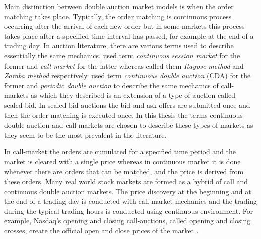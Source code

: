 
Main distinction between double auction market models is when
the order matching takes place. Typically, the order matching 
is continuous process occurring after the arrival of each new order but
in some markets this process takes place after a specified time interval
has passed, for example at the end of a trading day. \citep{boer05}
In auction literature, there are various terms used to describe essentially 
the same mechanics. \citet{boer05} used term 
\textit{continuous session market} for the former and \textit{call-market}
for the latter whereas \citet{ASt05} called them \textit{Itayose method}
and \textit{Zaraba method} respectively. \citet{Moc15} used term \textit{continuous 
double auction} (CDA) for the former and \textit{periodic double auction} to describe 
the same mechanics of call-markets as which they described is an extension of 
a type of auction called sealed-bid. In sealed-bid auctions the bid and ask offers
are submitted once and then the order matching is executed once. In this thesis
the terms continuous double auction and call-markets are chosen to describe
these types of markets as they seem to be the most prevalent in the literature.

In call-market the orders are cumulated for a specified time period and the
market is cleared with a single price whereas in continuous market it is done
whenever there are orders that can be matched, and the price is derived from these
orders. \citep{boer05} 
Many real world stock markets are formed as a hybrid of call and continuous
double auction markets. The price discovery at the beginning and at the end of a 
trading day is conducted with call-market mechanics and the trading during the 
typical trading hours is conducted using continuous environment. \citet{NasdaqClosing05}
For example, Nasdaq's opening and closing call-auctions, called opening and closing crosses,
create the official open and close prices of the market \citet{NasdaqCrosses}.  
 
